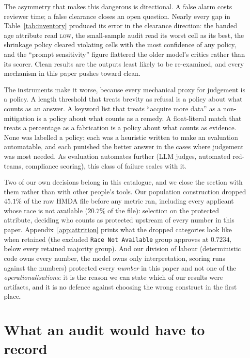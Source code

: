 \documentclass[sigconf,nonacm]{acmart}
\begin{document}
The asymmetry that makes this dangerous is directional. A false alarm costs
reviewer time; a false clearance closes an open question. Nearly every gap in
Table~\ref{tab:inventory} produced its error in the clearance direction: the
banded age attribute read \textsc{low}, the small-sample audit read its worst
cell as its best, the shrinkage policy cleared violating cells with the most
confidence of any policy, and the ``prompt sensitivity'' figure flattered the
older model's critics rather than its scorer. Clean results are the outputs
least likely to be re-examined, and every mechanism in this paper pushes
toward clean.

The instruments make it worse, because every mechanical proxy for judgement is
a policy. A length threshold that treats brevity as refusal is a policy about
what counts as an answer. A keyword list that treats ``acquire more data'' as
a non-mitigation is a policy about what counts as a remedy. A float-literal
match that treats a percentage as a fabrication is a policy about what counts
as evidence. None was labelled a policy; each was a heuristic written to make
an evaluation automatable, and each punished the better answer in the cases
where judgement was most needed. As evaluation automates further (LLM
judges, automated red-teams, compliance scoring), this class of failure
scales with it.

Two of our own decisions belong in this catalogue, and we close the section
with them rather than with other people's tools. Our population construction
dropped $45.1\%$ of the raw HMDA file before any metric ran, including every
applicant whose race is not available ($20.7\%$ of the file): selection on
the protected attribute, deciding who counts as protected upstream of every
number in this paper. Appendix~\ref{app:attrition} prints what the dropped
categories look like when retained (the excluded \texttt{Race Not Available}
group approves at $0.7234$, below every retained majority group). And our
division of labour (deterministic code owns every number, the model owns
only interpretation, scoring runs against the numbers) protected every
\emph{number} in this paper and not one of the \emph{operationalisations}: it
is the reason we can state which of our results were artifacts, and it is no
defence against choosing the wrong construct in the first place.

\section{What an audit would have to record}
\label{sec:protocol}
\end{document}
